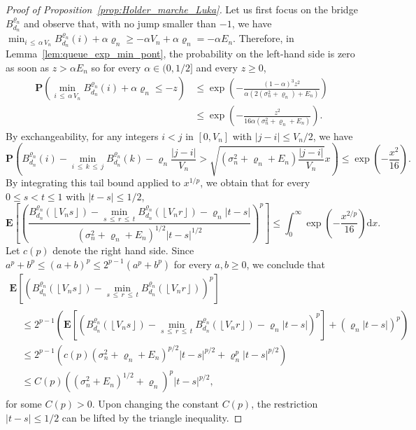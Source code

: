 \documentclass[AHL,Unicode,longabstracts,published]{cedram}
\newcommand{\ensembles}[1]{\mathbf{#1}}
\renewcommand{\P}{\ensembles{P}}
\newcommand{\E}{\ensembles{E}}
\renewcommand{\Pr}[1]{\P\left(#1\right)}
\newcommand{\Es}[1]{\E\left[#1\right]}
\newcommand{\1}{\ensembles{1}}
\renewcommand{\le}{\leqslant}
\renewcommand{\ge}{\geqslant}
\renewcommand{\d}{\mathrm{d}}
\newcommand{\Bfn}{B_{d_n}^{\varrho_n}}
\newcommand{\edges}{E}
\newcommand{\vertices}{V}
\begin{document}
\begin{proof}[Proof of Proposition~\ref{prop:Holder_marche_Luka}]
Let us first focus on the bridge $\Bfn$ and observe that, with no jump smaller than $-1$, we have $\min_{i \,\le\,\alpha\,\vertices_n} \Bfn(i) + \alpha \varrho_n \ge - \alpha \vertices_n + \alpha \varrho_n = - \alpha \edges_n$. Therefore, in Lemma~\ref{lem:queue_exp_min_pont}, the probability on the left-hand side is zero as soon as $z > \alpha \edges_n$ so for every $\alpha \in (0,1/2]$ and every $z \ge 0$,
\begin{align*}
\Pr{\min_{i\,\le\,\alpha\,\vertices_n} \Bfn(i) + \alpha \varrho_n \le - z} &\le \exp\left(- \frac{(1 - \alpha)^3 z^2}{\alpha \left(2 \left(\sigma_n^2+\varrho_n\right) + \edges_n\right)}\right)
\\
&\le \exp\left(- \frac{z^2}{16 \alpha \left(\sigma_n^2+\varrho_n + \edges_n\right)}\right).
\end{align*}
By exchangeability, for any integers $i < j$ in $[0, \vertices_n]$ with $|j-i| \le \vertices_n/2$, we have
\[
\P\left(\Bfn(i) - \min_{i\,\le\,k\,\le\,j} \Bfn(k) - \varrho_n \frac{|j-i|}{\vertices_n} > \sqrt{\left(\sigma_n^2+\varrho_n + \edges_n\right) \frac{|j-i|}{\vertices_n}} x\right)
\le \exp\left(- \frac{x^2}{16}\right).
\]
By integrating this tail bound applied to $x^{1/p}$, we obtain that for every $0 \le s < t \le 1$ with $|t-s| \le 1/2$,
\[
\Es{\left(\frac{\Bfn\left(\left\lfloor\vertices_ns\right\rfloor\right) - \min\limits_{s\,\le\,r\,\le\,t} \Bfn\left(\left\lfloor\vertices_nr\right\rfloor\right) - \varrho_n |t-s|}{\left(\sigma_n^2+\varrho_n + \edges_n\right)^{1/2} |t-s|^{1/2}}\right)^p}
\le \int_0^\infty \exp\left(- \frac{x^{2/p}}{16}\right) \d x.
\]
Let $c(p)$ denote the right hand side. Since $a^p + b^p \le (a+b)^p \le 2^{p-1} (a^p + b^p)$ for every $a,b \ge 0$, we conclude that
\begin{multline*}
\Es{\left(\Bfn\left(\left\lfloor\vertices_ns\right\rfloor\right) - \min_{s\,\le\,r\,\le\,t} \Bfn\left(\left\lfloor\vertices_nr\right\rfloor\right)\right)^p}
\\
\begin{aligned}
&\le 2^{p-1} \left(\Es{\left(\Bfn\left(\left\lfloor\vertices_ns\right\rfloor\right) - \min_{s\,\le\,r\,\le\, t} \Bfn\left(\left\lfloor\vertices_nr\right\rfloor\right) - \varrho_n |t-s|\right)^p} + \left(\varrho_n |t-s|\right)^p\right)
\\
&\le 2^{p-1} \left(c(p) \left(\sigma_n^2+\varrho_n + \edges_n\right)^{p/2} |t-s|^{p/2} + \varrho_n^p |t-s|^{p/2}\right)
\\
&\le C(p) \left(\left(\sigma_n^{2}+\edges_{n}\right)^{1/2} + \varrho_n\right)^p |t-s|^{p/2},
\end{aligned}
\end{multline*}
for some $C(p) > 0$. Upon changing the constant $C(p)$, the restriction $|t-s|\le 1/2$ can be lifted by the triangle inequality.


\end{proof}
\end{document}
